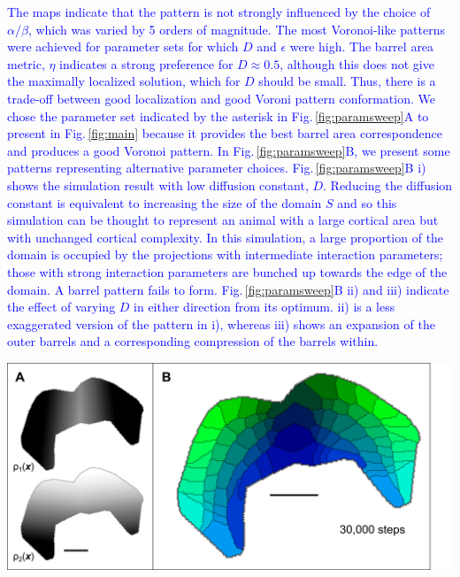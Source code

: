 \documentclass[9pt,lineno]{elife}
\newcommand{\cmnt}[1]{\textcolor{blue}{#1}}
\begin{document}
\cmnt{The maps indicate that the pattern is not strongly influenced by the
  choice of $\alpha/\beta$, which was varied by 5 orders of magnitude. The
  most Voronoi-like patterns were achieved for parameter sets for which $D$
  and $\epsilon$ were high. The barrel area metric, $\eta$ indicates a strong
  preference for $D\approx0.5$, although this does not give the maximally
  localized solution, which for $D$ should be small. Thus, there is a
  trade-off between good localization and good Voroni pattern conformation. We
  chose the parameter set indicated by the asterisk in
  Fig.\,\ref{fig:paramsweep}A to present in Fig.\,\ref{fig:main} because it
  provides the best barrel area correspondence and produces a good Voronoi
  pattern. In Fig.\,\ref{fig:paramsweep}B, we present some patterns
  representing alternative parameter choices. Fig.\,\ref{fig:paramsweep}B i)
  shows the simulation result with low diffusion constant, $D$. Reducing the
  diffusion constant is equivalent to increasing the size of the domain $S$
  and so this simulation can be thought to represent an animal with a large
  cortical area but with unchanged cortical complexity. In this simulation, a
  large proportion of the domain is occupied by the projections with
  intermediate interaction parameters; those with strong interaction
  parameters are bunched up towards the edge of the domain. A barrel pattern
  fails to form. Fig.\,\ref{fig:paramsweep}B ii) and iii) indicate the effect
  of varying $D$ in either direction from its optimum. ii) is a less
  exaggerated version of the pattern in i), whereas iii) shows an expansion of
  the outer barrels and a corresponding compression of the barrels within.}

\begin{center}
  \includegraphics[width=\linewidth]{./Fig3.png}
  \label{fig:fgf8}
\end{center}
\end{document}
